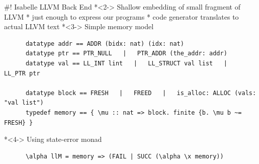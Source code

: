 \documentclass[fleqn]{beamer}
\begin{document}
{#! Isabelle LLVM Back End
  *<2-> Shallow embedding of small fragment of LLVM
    * just enough to express our programs
    * code generator translates to actual LLVM text
  *<3-> Simple memory model {\small
    \begin{lstlisting}
      datatype addr == ADDR (bidx: nat) (idx: nat)
      datatype ptr == PTR_NULL   |   PTR_ADDR (the_addr: addr)
      datatype val == LL_INT lint   |   LL_STRUCT val list   |   LL_PTR ptr

      datatype block == FRESH   |   FREED   |   is_alloc: ALLOC (vals: "val list")
      typedef memory == { \mu :: nat => block. finite {b. \mu b ~= FRESH} }
    \end{lstlisting}}

  *<4-> Using state-error monad
    \begin{lstlisting}
      \alpha llM = memory => (FAIL | SUCC (\alpha \x memory))
    \end{lstlisting}




}
\end{document}
